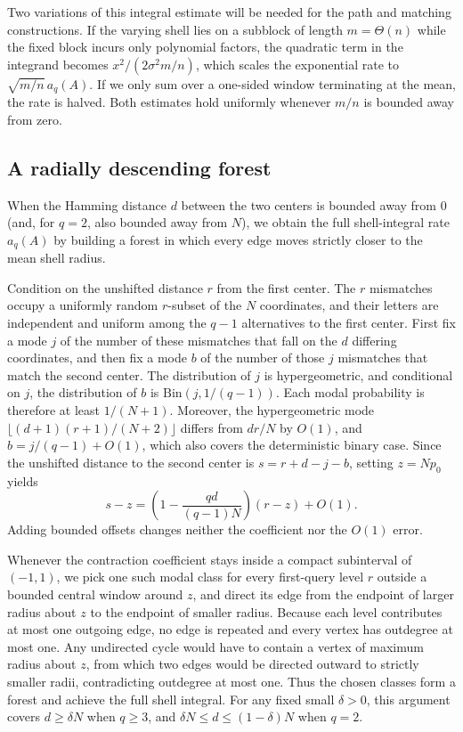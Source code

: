 Two variations of this integral estimate will be needed for the path and matching constructions. If the varying shell lies on a subblock of length $m=\Theta(n)$ while the fixed block incurs only polynomial factors, the quadratic term in the integrand becomes $x^2/(2\sigma^2 m/n)$, which scales the exponential rate to $\sqrt{m/n}\,a_q(A)$. If we only sum over a one-sided window terminating at the mean, the rate is halved. Both estimates hold uniformly whenever $m/n$ is bounded away from zero.

\subsection{A radially descending forest}
When the Hamming distance $d$ between the two centers is bounded away from $0$ (and, for $q=2$, also bounded away from $N$), we obtain the full shell-integral rate $a_q(A)$ by building a forest in which every edge moves strictly closer to the mean shell radius.

Condition on the unshifted distance $r$ from the first center. The $r$ mismatches occupy a uniformly random $r$-subset of the $N$ coordinates, and their letters are independent and uniform among the $q-1$ alternatives to the first center. First fix a mode $j$ of the number of these mismatches that fall on the $d$ differing coordinates, and then fix a mode $b$ of the number of those $j$ mismatches that match the second center. The distribution of $j$ is hypergeometric, and conditional on $j$, the distribution of $b$ is $\mathrm{Bin}(j,1/(q-1))$. Each modal probability is therefore at least $1/(N+1)$. Moreover, the hypergeometric mode $\lfloor(d+1)(r+1)/(N+2)\rfloor$ differs from $dr/N$ by $O(1)$, and $b=j/(q-1)+O(1)$, which also covers the deterministic binary case. Since the unshifted distance to the second center is $s=r+d-j-b$, setting $z=Np_0$ yields
\[
 s-z=\left(1-\frac{qd}{(q-1)N}\right)(r-z)+O(1).
\]
Adding bounded offsets changes neither the coefficient nor the $O(1)$ error.

Whenever the contraction coefficient stays inside a compact subinterval of $(-1,1)$, we pick one such modal class for every first-query level $r$ outside a bounded central window around $z$, and direct its edge from the endpoint of larger radius about $z$ to the endpoint of smaller radius. Because each level contributes at most one outgoing edge, no edge is repeated and every vertex has outdegree at most one. Any undirected cycle would have to contain a vertex of maximum radius about $z$, from which two edges would be directed outward to strictly smaller radii, contradicting outdegree at most one. Thus the chosen classes form a forest and achieve the full shell integral. For any fixed small $\delta>0$, this argument covers $d\ge\delta N$ when $q\ge3$, and $\delta N\le d\le(1-\delta)N$ when $q=2$.

